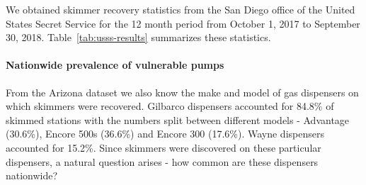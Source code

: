 We obtained skimmer recovery statistics from the San Diego office of the United
States Secret Service for the 12 month period from October 1, 2017 to September
30, 2018. Table~\ref{tab:usss-results} summarizes these statistics.

\paragraph{Nationwide prevalence of vulnerable pumps}
%

From the Arizona dataset we also know the make and model of gas dispensers on which skimmers were recovered. Gilbarco dispensers accounted for 84.8\% of skimmed stations with the numbers split between different models - Advantage (30.6\%), Encore 500s (36.6\%) and Encore 300 (17.6\%). Wayne dispensers accounted for 15.2\%. Since skimmers were discovered on these particular dispensers, a natural question arises - how common are these dispensers nationwide?

